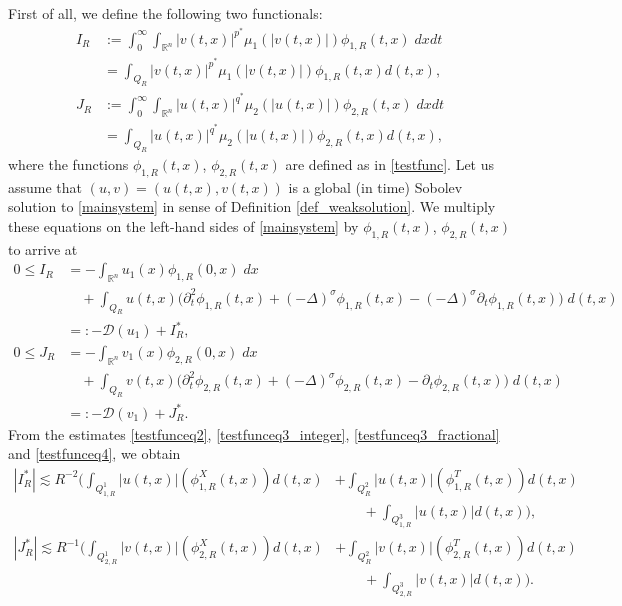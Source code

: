 \documentclass[11pt,reqno]{amsart}
\newcommand{\tron}[1]{\left( #1 \right)}
\numberwithin{equation}{section}
\begin{document}
 First of all, we define the following two functionals:
\[
\begin{aligned}
I_{R}&:=\int_{0}^{\infty}\int_{\mathbb{R}^n}|v(t,x)|^{p^*}\mu_1(|v(t,x)|)\phi_{1,R}(t,x)\;dxdt \\
&=\int_{Q_{R}}|v(t,x)|^{p^*}\mu_1(|v(t,x)|)\phi_{1,R}(t,x)d(t,x),\\    J_{R}&:=\int_{0}^{\infty}\int_{\mathbb{R}^n}|u(t,x)|^{q^*}\mu_2(|u(t,x)|)\phi_{2,R}(t,x)\;dxdt \\
&=\int_{Q_{R}}|u(t,x)|^{q^*}\mu_2(|u(t,x)|)\phi_{2,R}(t,x)d(t,x),  
\end{aligned}
\]
where the functions $\phi_{1,R}(t,x)$, $\phi_{2,R}(t,x)$ are defined as in \eqref{testfunc}. Let us assume that $(u,v)=(u(t,x),v(t,x))$ is a global (in time) Sobolev solution to \eqref{mainsystem} in sense of Definition \ref{def_weaksolution}. We multiply these equations on the left-hand sides of \eqref{mainsystem} by $\phi_{1,R}(t,x)$, $\phi_{2,R}(t,x)$ to arrive at
\begin{align}
0\leq I_{R}&=-\int_{\mathbb{R}^n}u_1(x)\phi_{1,R}(0,x)\;dx\nonumber\\
&\quad +\int_{Q_{R}}u(t,x)\big(\partial^2_t \phi_{1,R}(t,x)+(-\Delta)^{\sigma}\phi_{1,R}(t,x)-(-\Delta)^{\sigma}\partial_t \phi_{1,R}(t,x)\big)\;d(t,x)\nonumber\\
&=:-\mathcal{D}(u_1)+I^*_{R},\label{thr1.2esI1R}\\
0\leq J_{R}&=-\int_{\mathbb{R}^n}v_1(x)\phi_{2,R}(0,x)\;dx \nonumber\\
&\quad+\int_{Q_{R}}v(t,x)\big(\partial^2_t \phi_{2,R}(t,x)+(-\Delta)^{\sigma}\phi_{2,R}(t,x)-\partial_t  \phi_{2,R}(t,x)\big)\;d(t,x)\nonumber\\
&=:-\mathcal{D}(v_1)+J^*_{R}.\label{thr1.2esJ2R}
\end{align}
From the estimates \eqref{testfunceq2}, \eqref{testfunceq3_integer}, \eqref{testfunceq3_fractional} and \eqref{testfunceq4}, we obtain
\begin{equation}\label{thr1.2esI1R*}
\begin{aligned}
\left|I_{R}^*\right|\lesssim R^{-2}\Bigg( \int_{Q^1_{1,R}}|u(t,x)|\left(\phi^{X}_{1,R}(t,x)\right)d(t,x)&+\int_{Q^2_{R}}|u(t,x)|\tron{\phi^{T}_{1,R}(t,x)}d(t,x)\\
&\qquad+\int_{Q^3_{1,R}}|u(t,x)|d(t,x)\Bigg),
\end{aligned}   
\end{equation}
\begin{equation}\label{thr1.2esJ2R*}
\begin{aligned}
\left|J_{R}^*\right|\lesssim  R^{-1}\Bigg(\int_{Q^1_{2,R}}|v(t,x)|\left(\phi^{X}_{2,R}(t,x)\right)d(t,x)&+\int_{Q^2_{R}}|v(t,x)|\left(\phi^{T}_{2,R}(t,x)\right)d(t,x)\\
&\qquad+\int_{Q^3_{2,R}}|v(t,x)|d(t,x)\Bigg).
\end{aligned}
\end{equation}
\end{document}
